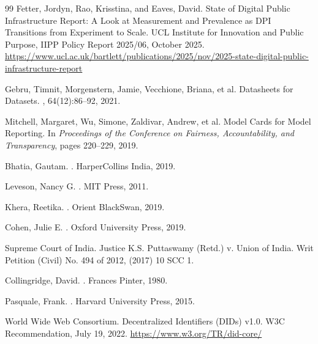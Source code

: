 \documentclass{article}
\begin{document}
\begin{thebibliography}{99}
Fetter, Jordyn, Rao, Krisstina, and Eaves, David.
 State of Digital Public Infrastructure Report: A Look at Measurement and Prevalence as DPI Transitions from Experiment to Scale.
\newblock UCL Institute for Innovation and Public Purpose, IIPP Policy Report 2025/06, October 2025.
\newblock \url{https://www.ucl.ac.uk/bartlett/publications/2025/nov/2025-state-digital-public-infrastructure-report}

Gebru, Timnit, Morgenstern, Jamie, Vecchione, Briana, et al.
\newblock Datasheets for Datasets.
, 64(12):86--92, 2021.

Mitchell, Margaret, Wu, Simone, Zaldivar, Andrew, et al.
\newblock Model Cards for Model Reporting.
\newblock In {\em Proceedings of the Conference on Fairness, Accountability, and Transparency}, pages 220--229, 2019.

Bhatia, Gautam.
.
\newblock HarperCollins India, 2019.

Leveson, Nancy G.
.
\newblock MIT Press, 2011.

Khera, Reetika.
.
\newblock Orient BlackSwan, 2019.

Cohen, Julie E.
.
\newblock Oxford University Press, 2019.

Supreme Court of India.
\newblock Justice K.S. Puttaswamy (Retd.) v. Union of India.
\newblock Writ Petition (Civil) No. 494 of 2012, (2017) 10 SCC 1.

Collingridge, David.
.
\newblock Frances Pinter, 1980.

Pasquale, Frank.
.
\newblock Harvard University Press, 2015.

World Wide Web Consortium.
\newblock Decentralized Identifiers (DIDs) v1.0.
\newblock W3C Recommendation, July 19, 2022.
\newblock \url{https://www.w3.org/TR/did-core/}


\end{thebibliography}
\end{document}
